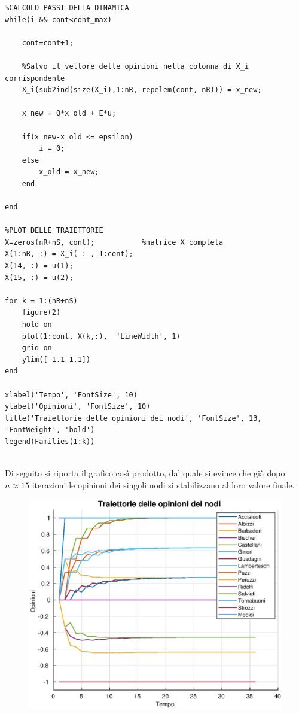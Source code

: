 \documentclass[13pt,largemargins]{homework}
\begin{document}
\begin{enumerate}[label=(\alph*)]
\begin{lstlisting}
%CALCOLO PASSI DELLA DINAMICA
while(i && cont<cont_max)
   
    cont=cont+1; 
    
    %Salvo il vettore delle opinioni nella colonna di X_i corrispondente
    X_i(sub2ind(size(X_i),1:nR, repelem(cont, nR))) = x_new; 
    
    x_new = Q*x_old + E*u;
    
    if(x_new-x_old <= epsilon)
        i = 0; 
    else
        x_old = x_new; 
    end
    
end

%PLOT DELLE TRAIETTORIE 
X=zeros(nR+nS, cont); 			%matrice X completa
X(1:nR, :) = X_i( : , 1:cont); 
X(14, :) = u(1); 
X(15, :) = u(2);

for k = 1:(nR+nS)
    figure(2)
    hold on
    plot(1:cont, X(k,:),  'LineWidth', 1)
    grid on 
    ylim([-1.1 1.1])		
end

xlabel('Tempo', 'FontSize', 10)
ylabel('Opinioni', 'FontSize', 10)
title('Traiettorie delle opinioni dei nodi', 'FontSize', 13, 'FontWeight', 'bold')
legend(Families(1:k))


\end{lstlisting}


Di seguito si riporta il grafico così prodotto, dal quale si evince che già dopo $n\approx15$ iterazioni le opinioni dei singoli nodi si stabilizzano al loro valore finale.

\begin{figure}[h]
\centering
\includegraphics[scale=0.6]{traiettorie}%
\end{figure}


\end{enumerate}
\end{document}
